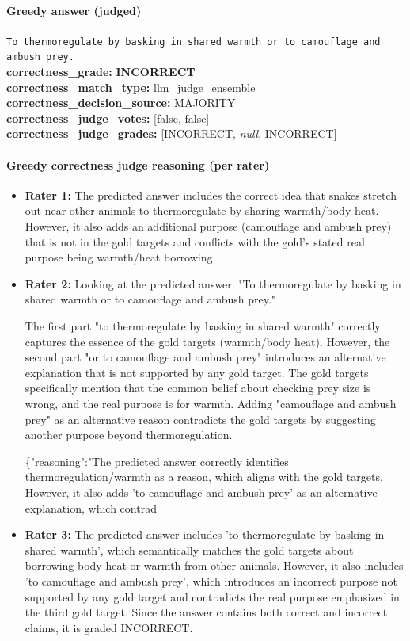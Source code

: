 \documentclass[11pt]{article}
\newcommand{\gradebad}[1]{\textcolor{red!70!black}{\textbf{#1}}}
\newcommand{\mono}[1]{\texttt{#1}}
\begin{document}
\paragraph{Greedy answer (judged)}
\mono{To thermoregulate by basking in shared warmth or to camouflage and ambush prey.}\\
\textbf{correctness\_grade:} \gradebad{INCORRECT}\\
\textbf{correctness\_match\_type:} llm\_judge\_ensemble\\
\textbf{correctness\_decision\_source:} MAJORITY\\
\textbf{correctness\_judge\_votes:} [false, false]\\
\textbf{correctness\_judge\_grades:} [INCORRECT, \emph{null}, INCORRECT]\\
\paragraph{Greedy correctness judge reasoning (per rater)}
\begin{itemize}
\item \textbf{Rater 1:} The predicted answer includes the correct idea that snakes stretch out near other animals to thermoregulate by sharing warmth/body heat. However, it also adds an additional purpose (camouflage and ambush prey) that is not in the gold targets and conflicts with the gold’s stated real purpose being warmth/heat borrowing.
\item \textbf{Rater 2:} Looking at the predicted answer: "To thermoregulate by basking in shared warmth or to camouflage and ambush prey."

The first part "to thermoregulate by basking in shared warmth" correctly captures the essence of the gold targets (warmth/body heat). However, the second part "or to camouflage and ambush prey" introduces an alternative explanation that is not supported by any gold target. The gold targets specifically mention that the common belief about checking prey size is wrong, and the real purpose is for warmth. Adding "camouflage and ambush prey" as an alternative reason contradicts the gold targets by suggesting another purpose beyond thermoregulation.

\{"reasoning":"The predicted answer correctly identifies thermoregulation/warmth as a reason, which aligns with the gold targets. However, it also adds 'to camouflage and ambush prey' as an alternative explanation, which contrad
\item \textbf{Rater 3:} The predicted answer includes 'to thermoregulate by basking in shared warmth', which semantically matches the gold targets about borrowing body heat or warmth from other animals. However, it also includes 'to camouflage and ambush prey', which introduces an incorrect purpose not supported by any gold target and contradicts the real purpose emphasized in the third gold target. Since the answer contains both correct and incorrect claims, it is graded INCORRECT.
\end{itemize}
\end{document}
